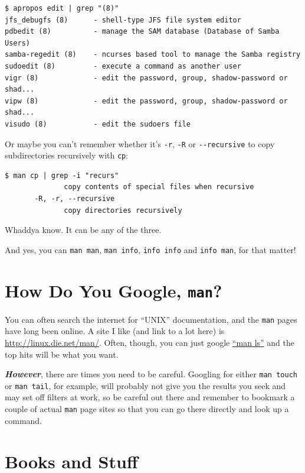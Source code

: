 \documentclass[10pt,]{book}
\numberwithin{figure}{chapter}
\begin{document}
\begin{verbatim}
$ apropos edit | grep "(8)"
jfs_debugfs (8)      - shell-type JFS file system editor
pdbedit (8)          - manage the SAM database (Database of Samba Users)
samba-regedit (8)    - ncurses based tool to manage the Samba registry
sudoedit (8)         - execute a command as another user
vigr (8)             - edit the password, group, shadow-password or shad...
vipw (8)             - edit the password, group, shadow-password or shad...
visudo (8)           - edit the sudoers file
\end{verbatim}

Or maybe you can't remember whether it's \texttt{-r}, \texttt{-R} or
\texttt{-{}-recursive} to copy subdirectories recursively with
\texttt{cp}:

\begin{verbatim}
$ man cp | grep -i "recurs"
              copy contents of special files when recursive
       -R, -r, --recursive
              copy directories recursively
\end{verbatim}

Whaddya know. It can be any of the three.

And yes, you can \texttt{man man}, \texttt{man info}, \texttt{info info}
and \texttt{info man}, for that matter!

\section{How Do You Google, \texttt{man}?}\label{how-do-you-google-man}

You can often search the internet for ``UNIX'' documentation, and the
\texttt{man} pages have long been online. A site I like (and link to a
lot here) is \url{http://linux.die.net/man/}. Often, though, you can
just google \href{https://www.google.com/\#q=man+ls}{``man ls''} and the
top hits will be what you want.

\textbf{\emph{However}}, there are times you need to be careful.
Googling for either \texttt{man touch} or \texttt{man tail}, for
example, will probably not give you the results you seek and may set off
filters at work, so be careful out there and remember to bookmark a
couple of actual \texttt{man} page sites so that you can go there
directly and look up a command.

\section{Books and Stuff}\label{books-and-stuff}
\end{document}
